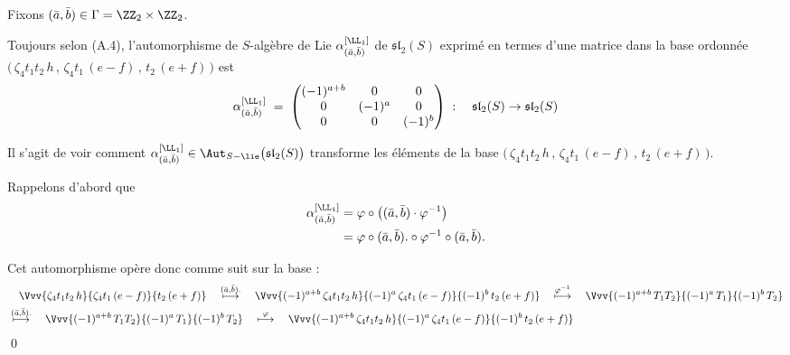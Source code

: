 \begin{annexeLem} 
Fixons $(\bar{a},\bar{b}) \in \Gamma = \ZZ_2 \times \ZZ_2$. 

Toujours selon (A.4), l'automorphisme de $S$-algèbre de Lie $\alpha_{(\bar{a},\bar{b})}^{[\LL_1]}$ de $\mathfrak{sl}_2(S)$ exprimé en termes d'une matrice dans la base ordonnée $\big(\, \zeta_4t_1t_2\,h \, ,\, \zeta_4t_1\,(e - f) \, ,\, t_2\,(e+f) \, \big)$ est 
$$ \alpha_{(\bar{a},\bar{b})}^{[\LL_1]} \; = \;
\begin{pmatrix}
(-1)^{a+b} & 0 & 0 \\ 
0 & (-1)^{a} & 0 \\
0 & 0 & (-1)^{b}
\end{pmatrix} \; :  \quad \mathfrak{sl}_2(S) \rightarrow \mathfrak{sl}_2(S) $$
\begin{pre} Il s'agit de voir comment $\alpha_{(\bar{a},\bar{b})}^{[\LL_1]} \in \Aut_{S-\lie}\big(\mathfrak{sl}_2(S)\big)$ transforme les éléments de la base $\big(\, \zeta_4t_1t_2\,h \, ,\, \zeta_4t_1\,(e - f) \, ,\, t_2\,(e+f) \, \big)$.

Rappelons d'abord que 
\begin{align*} 
\alpha_{(\bar{a},\bar{b})}^{[\LL_1]} &= \varphi \circ \big((\bar{a},\bar{b}) \cdot \varphi^{-1}\big) \\
&=\varphi \circ (\bar{a},\bar{b}). \circ \varphi^{-1} \circ (\bar{a},\bar{b}).
\end{align*} 

Cet automorphisme opère donc comme suit sur la base :
\begin{align*} 
&\quad \Vvv{\zeta_4t_1t_2\,h}{\zeta_4t_1\,(e-f)}{t_2\,(e+f)} \quad 
\stackrel{(\bar{a},\bar{b}).}{\longmapsto} \quad \Vvv{(-1)^{a+b} \, \zeta_4t_1t_2\,h}{(-1)^a \, \zeta_4t_1\,(e-f)}{(-1)^b \, t_2\,(e+f)} \quad 
\stackrel{\varphi^{-1}}{\longmapsto} \quad \Vvv{(-1)^{a+b} \, T_1T_2}{(-1)^a \, T_1}{(-1)^b \, T_2} \\
&\stackrel{(\bar{a},\bar{b}).}{\longmapsto} \quad \Vvv{(-1)^{a+b} \, T_1T_2}{(-1)^a \, T_1}{(-1)^b \, T_2} \quad 
\stackrel{\varphi}{\longmapsto} \quad \Vvv{(-1)^{a+b} \, \zeta_4t_1t_2\,h}{(-1)^a \, \zeta_4t_1\,(e-f)}{(-1)^b \, t_2\,(e+f)}
\end{align*}
\qed
\end{pre}
\end{annexeLem}
 
